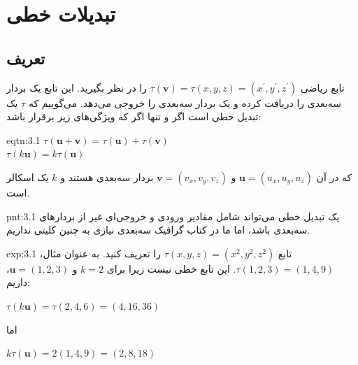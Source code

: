 \setcounter{figure}{0}
\renewcommand{\thefigure}{\arabic{figure}.\arabic{chapter}}


\section{\textbf{تبدیلات خطی}}
\label{sec:3.1}

\subsection{\textbf{تعریف}}
\label{subsec:3.1.1}
{
    \Large
    \begin{spacing}{1.5}
        تابع ریاضی $\tau(\textbf{v})=\tau(x,y,z)=(x^\prime,y^\prime,z^\prime)$ را در نظر بگیرید.
        این تابع یک بردار سه‌بعدی را دریافت کرده و یک بردار سه‌بعدی را خروجی می‌دهد.
        می‌گوییم که $\tau$ یک تبدیل خطی است اگر و تنها اگر که ویژگی‌های زیر برقرار باشد:

        \begin{eqtn}{eqtn:3.1}
            \centering
            $\tau(\textbf{u}+\textbf{v})=\tau(\textbf{u})+\tau(\textbf{v})$\\
            $\tau(k\textbf{u})=k\tau(\textbf{u})$
        \end{eqtn}

        که در آن $\textbf{u}=(u_x,u_y,u_z)$ و $\textbf{v}=(v_x,v_y,v_z)$ بردار سه‌بعدی هستند و $k$ یک اسکالر است.

        \begin{point}{pnt:3.1}
            یک تبدیل خطی می‌تواند شامل مقادیر ورودی و خروجی‌ای غیر از بردارهای سه‌بعدی باشد،
            اما ما در کتاب گرافیک سه‌بعدی نیازی به چنین کلیتی نداریم.
        \end{point}

        \begin{example}{exp:3.1}
            \Large
            تابع $\tau(x,y,z)=(x^2,y^2,z^2)$ را تعریف کنید.
            به عنوان مثال، $\tau(1,2,3)=(1,4,9)$. این تابع خطی نیست زیرا برای $k=2$ و $\textbf{u}=(1,2,3)$، داریم:

            \begin{center}
                $\tau(k\textbf{u})=\tau(2,4,6)=(4,16,36)$
            \end{center}

            اما

            \begin{center}
                $k\tau(\textbf{u})=2(1,4,9)=(2,8,18)$
            \end{center}


\end{example}
\end{spacing}}
